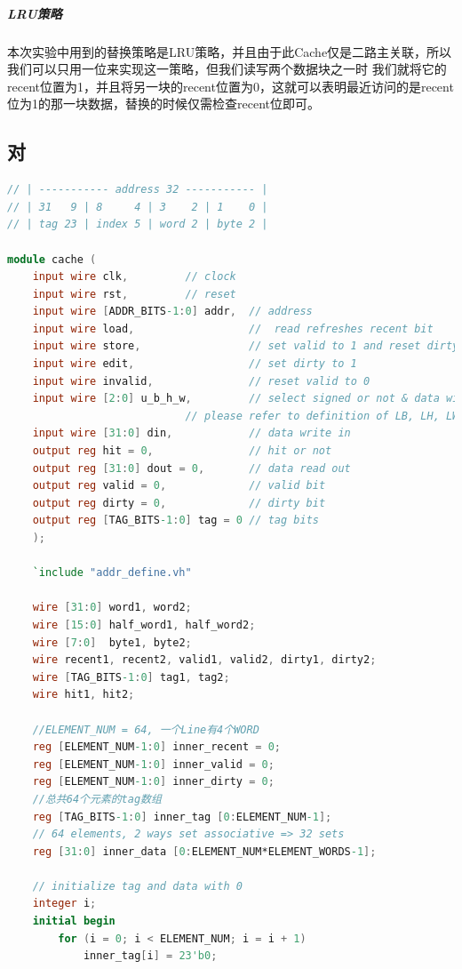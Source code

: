 \subparagraph{LRU策略} 本次实验中用到的替换策略是LRU策略，并且由于此Cache仅是二路主关联，所以我们可以只用一位来实现这一策略，但我们读写两个数据块之一时
我们就将它的recent位置为1，并且将另一块的recent位置为0，这就可以表明最近访问的是recent位为1的那一块数据，替换的时候仅需检查recent位即可。

\subsection{对}

\begin{lstlisting}[language = {verilog}]
// | ----------- address 32 ----------- |
// | 31   9 | 8     4 | 3    2 | 1    0 |
// | tag 23 | index 5 | word 2 | byte 2 |

module cache (
    input wire clk,         // clock
    input wire rst,         // reset
    input wire [ADDR_BITS-1:0] addr,  // address
    input wire load,                  //  read refreshes recent bit
    input wire store,                 // set valid to 1 and reset dirty to 0
    input wire edit,                  // set dirty to 1
    input wire invalid,               // reset valid to 0
    input wire [2:0] u_b_h_w,         // select signed or not & data width
                            // please refer to definition of LB, LH, LW, LBU, LHU in RV32I Instruction Set  
    input wire [31:0] din,            // data write in
    output reg hit = 0,               // hit or not
    output reg [31:0] dout = 0,       // data read out
    output reg valid = 0,             // valid bit
    output reg dirty = 0,             // dirty bit
    output reg [TAG_BITS-1:0] tag = 0 // tag bits
    );

    `include "addr_define.vh"

    wire [31:0] word1, word2;
    wire [15:0] half_word1, half_word2;
    wire [7:0]  byte1, byte2;
    wire recent1, recent2, valid1, valid2, dirty1, dirty2;
    wire [TAG_BITS-1:0] tag1, tag2;
    wire hit1, hit2;

    //ELEMENT_NUM = 64, 一个Line有4个WORD
    reg [ELEMENT_NUM-1:0] inner_recent = 0;
    reg [ELEMENT_NUM-1:0] inner_valid = 0;
    reg [ELEMENT_NUM-1:0] inner_dirty = 0;
    //总共64个元素的tag数组
    reg [TAG_BITS-1:0] inner_tag [0:ELEMENT_NUM-1];
    // 64 elements, 2 ways set associative => 32 sets
    reg [31:0] inner_data [0:ELEMENT_NUM*ELEMENT_WORDS-1];

    // initialize tag and data with 0
    integer i;
    initial begin
        for (i = 0; i < ELEMENT_NUM; i = i + 1)
            inner_tag[i] = 23'b0;


\end{lstlisting}
